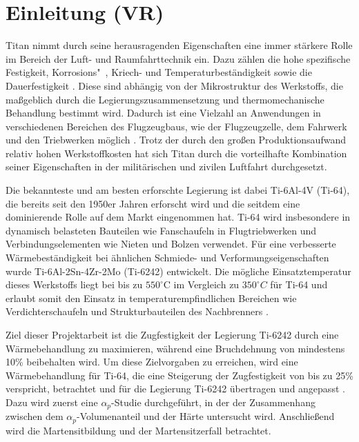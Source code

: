 \chapter{Einleitung (VR)} 

Titan nimmt durch seine herausragenden Eigenschaften eine immer stärkere Rolle im Bereich der Luft- und Raumfahrttechnik ein. Dazu zählen die hohe spezifische Festigkeit, Korrosions"~, Kriech- und Temperaturbeständigkeit sowie die Dauerfestigkeit \cite{Lutjering.2007}. Diese sind abhängig von der Mikrostruktur des Werkstoffs, die maßgeblich durch die Legierungszusammensetzung und thermomechanische Behandlung bestimmt wird. Dadurch ist eine Vielzahl an Anwendungen in verschiedenen Bereichen des Flugzeugbaus, wie der Flugzeugzelle, dem Fahrwerk und den Triebwerken möglich \cite{M.J.Donachie.2010}. Trotz der durch den großen Produktionsaufwand relativ hohen Werkstoffkos\-ten hat sich Titan durch die vorteilhafte Kombination seiner Eigenschaften in der militärischen und zivilen Luftfahrt durchgesetzt. 

Die bekannteste und am besten erforschte Legierung ist dabei Ti-6Al-4V (Ti-64), die bereits seit den 1950er Jahren erforscht wird und die seitdem eine dominierende Rolle auf dem Markt eingenommen hat. Ti-64 wird insbesondere in dynamisch belasteten Bauteilen wie Fanschaufeln in Flugtriebwerken und Verbindungselementen wie Nieten und Bolzen verwendet. 
Für eine verbesserte Wärmebeständigkeit bei ähnlichen Schmiede- und Verformungseigenschaften wurde Ti-6Al-2Sn-4Zr-2Mo (Ti-6242) entwickelt. Die mögliche Einsatztemperatur dieses Werkstoffs liegt bei bis zu $550^\circ $C im Vergleich zu $350^\circ C$ für Ti-64 und erlaubt somit den Einsatz in temperaturempfindlichen Bereichen wie Verdichterschaufeln und Strukturbauteilen des Nachbrenners \cite{Lutjering.2007}.
 
Ziel dieser Projektarbeit ist die Zugfestigkeit der Legierung Ti-6242 durch eine Wärmebehandlung zu maximieren, während eine Bruchdehnung von mindestens 10\% beibehalten wird. Um diese Zielvorgaben zu erreichen, wird eine Wärmebehandlung für Ti-64, die eine Steigerung der Zugfestigkeit von bis zu 25\% verspricht, betrachtet und für die Legierung Ti-6242 übertragen und angepasst \cite{Morita.2005}. Dazu wird zuerst eine $\alpha_p$-Studie durchgeführt, in der der Zusammenhang zwischen dem $\alpha_p$-Volumenanteil und der Härte untersucht wird. Anschließend wird die Martensitbildung und der Martensitzerfall betrachtet. 


